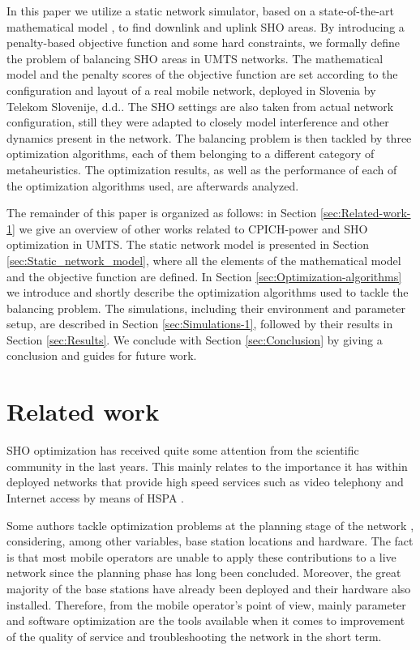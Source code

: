 In this paper we utilize a static network simulator, based on a state-of-the-art
mathematical model \cite{nawrocki2006understanding}, to find downlink
and uplink SHO areas. By introducing a penalty-based objective function
and some hard constraints, we formally define the problem of balancing
SHO areas in UMTS networks. The mathematical model and the penalty
scores of the objective function are set according to the configuration
and layout of a real mobile network, deployed in Slovenia by Telekom
Slovenije, d.d.. The SHO settings are also taken from actual network
configuration, still they were adapted to closely model interference
and other dynamics present in the network. The balancing problem is
then tackled by three optimization algorithms, each of them belonging
to a different category of metaheuristics. The optimization results,
as well as the performance of each of the optimization algorithms
used, are afterwards analyzed.

The remainder of this paper is organized as follows: in Section \ref{sec:Related-work-1}
we give an overview of other works related to CPICH-power and SHO
optimization in UMTS. The static network model is presented in Section
\ref{sec:Static_network_model}, where all the elements of the mathematical
model and the objective function are defined. In Section \ref{sec:Optimization-algorithms}
we introduce and shortly describe the optimization algorithms used
to tackle the balancing problem. The simulations, including their
environment and parameter setup, are described in Section \ref{sec:Simulations-1},
followed by their results in Section \ref{sec:Results}. We conclude
with Section \ref{sec:Conclusion} by giving a conclusion and guides
for future work.




\section{Related work \label{sec:Related-work-1}}

SHO optimization has received quite some attention from the scientific
community in the last years. This mainly relates to the importance
it has within deployed networks that provide high speed services such
as video telephony \cite{chen2010_impact_of_soft_handover} and Internet
access by means of HSPA \cite{chen2011_coverage_planning_for_optimizing_HSDPA}.

Some authors tackle optimization problems at the planning stage of
the network \cite{Eisenblatter_OptimizationMethodsForUMTSRadioNetworkPlanning,ghosh2011_optimising_CDMA_cell_planning},
considering, among other variables, base station locations and hardware.
The fact is that most mobile operators are unable to apply these contributions
to a live network since the planning phase has long been concluded.
Moreover, the great majority of the base stations have already been
deployed and their hardware also installed. Therefore, from the mobile
operator's point of view, mainly parameter and software optimization
are the tools available when it comes to improvement of the quality
of service and troubleshooting the network in the short term.

